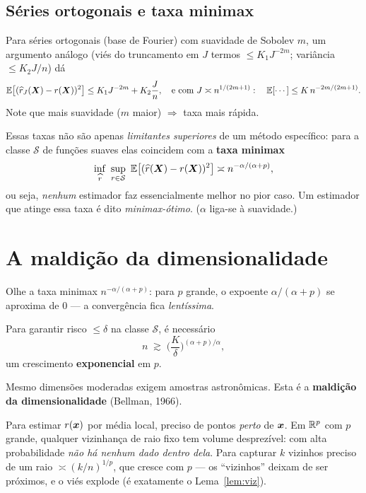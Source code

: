 \documentclass[11pt,a4paper]{article}
\begin{document}
\subsection{Séries ortogonais e taxa minimax}
Para séries ortogonais (base de Fourier) com suavidade de Sobolev $m$, um argumento
análogo (viés do truncamento em $J$ termos $\le K_1 J^{-2m}$; variância $\le K_2 J/n$)
dá
\[
  \mathbb{E}\big[(\widehat{r}_J(\bm{X})-r(\bm{X}))^2\big] \le K_1 J^{-2m} + K_2\frac{J}{n},
  \quad\text{e com } J\asymp n^{1/(2m+1)}:\quad
  \mathbb{E}[\cdots] \le K\, n^{-2m/(2m+1)}.
\]
Note que mais suavidade ($m$ maior) $\Rightarrow$ taxa mais rápida.

\begin{observacao}
Essas taxas não são apenas \emph{limitantes superiores} de um método específico:
para a classe $\mathcal{S}$ de funções suaves elas coincidem com a \textbf{taxa
minimax}
\[
  \inf_{\rhat}\ \sup_{r\in\mathcal{S}}\ \E\big[(\rhat(\X)-r(\X))^2\big]
  \asymp n^{-\alpha/(\alpha+p)},
\]
ou seja, \emph{nenhum} estimador faz essencialmente melhor no pior caso. Um
estimador que atinge essa taxa é dito \emph{minimax-ótimo}. ($\alpha$ liga-se à
suavidade.)
\end{observacao}

\section{A maldição da dimensionalidade}
Olhe a taxa minimax $n^{-\alpha/(\alpha+p)}$: para $p$ grande, o expoente
$\alpha/(\alpha+p)$ se aproxima de $0$ --- a convergência fica \emph{lentíssima}.

\begin{teorema}
Para garantir risco $\le\delta$ na classe $\mathcal{S}$, é necessário
\[
  n \;\gtrsim\; \Big(\frac{K}{\delta}\Big)^{(\alpha+p)/\alpha},
\]
um crescimento \textbf{exponencial} em $p$.
\end{teorema}
Mesmo dimensões moderadas exigem amostras astronômicas. Esta é a
\textbf{maldição da dimensionalidade} (Bellman, 1966).

\begin{ideia}
Para estimar $r(\bm{x})$ por média local, preciso de pontos \emph{perto} de $\bm{x}$. Em
$\mathbb{R}^p$ com $p$ grande, qualquer vizinhança de raio fixo tem volume
desprezível: com alta probabilidade \emph{não há nenhum dado dentro dela}. Para
capturar $k$ vizinhos preciso de um raio $\asymp (k/n)^{1/p}$, que cresce com $p$
--- os ``vizinhos'' deixam de ser próximos, e o viés explode (é exatamente o
Lema~\ref{lem:viz}).
\end{ideia}
\end{document}
